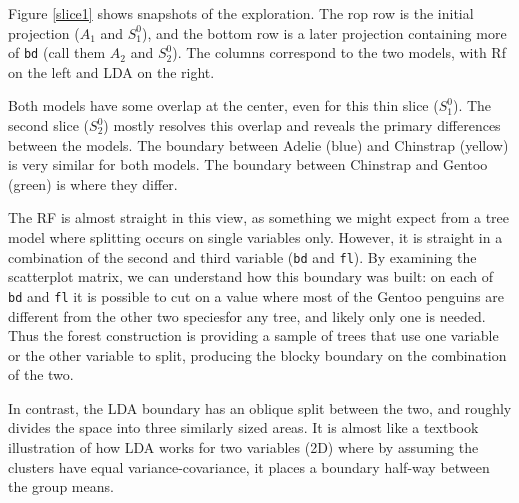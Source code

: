 \documentclass[]{interact}
\theoremstyle{plain}%
\theoremstyle{definition}
\theoremstyle{remark}
\begin{document}
Figure \ref{slice1} shows snapshots of the exploration. The rop row is
the initial projection (\(A_1\) and \(S_1^0\)), and the bottom row is a
later projection containing more of \texttt{bd} (call them \(A_2\) and
\(S_2^0\)). The columns correspond to the two models, with Rf on the
left and LDA on the right.

Both models have some overlap at the center, even for this thin slice
(\(S_1^0\)). The second slice (\(S_2^0\)) mostly resolves this overlap
and reveals the primary differences between the models. The boundary
between Adelie (blue) and Chinstrap (yellow) is very similar for both
models. The boundary between Chinstrap and Gentoo (green) is where they
differ.

The RF is almost straight in this view, as something we might expect
from a tree model where splitting occurs on single variables only.
However, it is straight in a combination of the second and third
variable (\texttt{bd} and \texttt{fl}). By examining the scatterplot
matrix, we can understand how this boundary was built: on each of
\texttt{bd} and \texttt{fl} it is possible to cut on a value where most
of the Gentoo penguins are different from the other two speciesfor any
tree, and likely only one is needed. Thus the forest construction is
providing a sample of trees that use one variable or the other variable
to split, producing the blocky boundary on the combination of the two.

In contrast, the LDA boundary has an oblique split between the two, and
roughly divides the space into three similarly sized areas. It is almost
like a textbook illustration of how LDA works for two variables (2D)
where by assuming the clusters have equal variance-covariance, it places
a boundary half-way between the group means.
\end{document}
